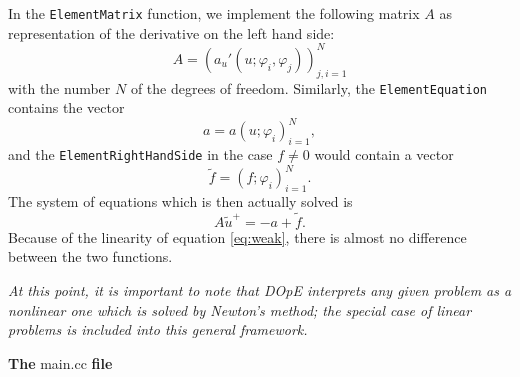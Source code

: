 In the \texttt{ElementMatrix} function, we implement the following matrix $A$ as representation of the derivative on the left hand side:
\begin{equation*}
  A = (a_u'(u;\varphi_i,\varphi_j))_{j,i=1}^N
\end{equation*}
with the number $N$ of the degrees of freedom. Similarly, the \texttt{ElementEquation} contains the vector
\begin{equation*}
  a = a(u;\varphi_i)_{i=1}^{N},
\end{equation*}
and the \texttt{ElementRightHandSide} in the case $f \neq 0$ would contain a vector
\begin{equation*}
  \tilde{f} = (f;\varphi_i)_{i=1}^N.
\end{equation*}
The system of equations which is then actually solved is
\begin{equation*}
  A\tilde{u}^+ = -a + \tilde{f}.
\end{equation*}
Because of the linearity of equation \eqref{eq:weak}, there is almost no difference between the two functions.\\

\vspace{0.1cm}

\textit{At this point, it is important to note that DOpE interprets any given problem as a nonlinear one which is solved by Newton's method; the special case of linear problems is included into this general framework.}\\

\vspace{0.2cm}

\textbf{The} main.cc \textbf{file}\\

\vspace{0.2cm}


